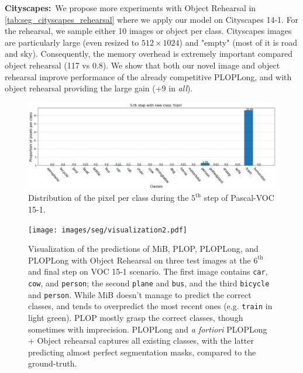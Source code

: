 \noindent\textbf{Cityscapes:\,} We propose more experiments with Object Rehearsal in
\autoref{tab:seg_cityscapes_rehearsal} where we apply our model on Cityscapes 14-1. For the rehearsal,
we sample either 10 images or object per class. Cityscapes images are particularly large (even
resized to $512 \times 1024$)  and "empty" (most of it is road and sky). Consequently, the memory
overhead is extremely important compared object rehearsal (117 vs 0.8). We show that both our novel
image and object rehearsal improve performance of the already competitive PLOPLong, and with object
rehearsal providing the large gain (+9 \pp in \textit{all}).




\begin{figure}
    \centering
    \includegraphics[width=\linewidth]{images/seg/distribution_5step_voc.png}
    \vspace*{-0.3cm}
    \caption{Distribution of the pixel per class during the $5^{\text{th}}$ step of Pascal-VOC
        15-1.}
    \label{fig:seg_distribution_voc_5th}
\end{figure}

\begin{figure}
    \centering
    \texttt{[image: images/seg/visualization2.pdf]}
    \caption{Visualization of the predictions of MiB, PLOP, PLOPLong, and PLOPLong with Object
        Rehearsal on three test images at the $6^\text{th}$ and final step on VOC 15-1 scenario. The
        first image contains \texttt{car}, \texttt{cow}, and \texttt{person}; the second
        \texttt{plane} and \texttt{bus}, and the third \texttt{bicycle} and \texttt{person}. While
        MiB doesn't manage to predict the correct classes, and tends to overpredict the most recent
        ones (e.g. \texttt{train} in light green). PLOP mostly grasp the correct classes, though
        sometimes with imprecision. PLOPLong and \textit{a fortiori} PLOPLong + Object rehearsal
        captures all existing classes, with the latter predicting almost perfect segmentation masks,
        compared to the ground-truth.}
    \label{fig:seg_visualization}
\end{figure}

